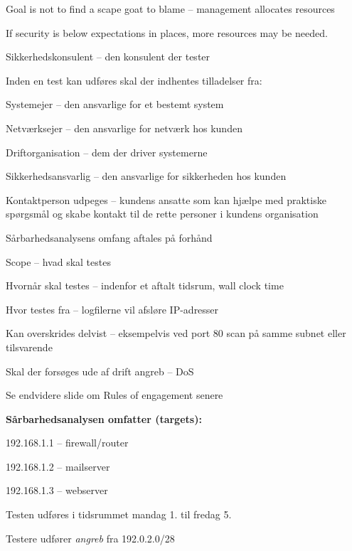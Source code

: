 \documentclass[Screen16to9,17pt]{foils}
\begin{document}
Goal is not to find a scape goat to blame -- management allocates resources

If security is below expectations in places, more resources may be needed.




\begin{list1}
\item Sikkerhedskonsulent -- den konsulent der tester
\item Inden en test kan udføres skal der indhentes tilladelser fra:
\begin{list2}
\item Systemejer -- den ansvarlige for et bestemt system
\item Netværksejer -- den ansvarlige for netværk hos kunden
\item Driftorganisation -- dem der driver systemerne
\item Sikkerhedsansvarlig -- den ansvarlige for sikkerheden hos kunden
\item Kontaktperson udpeges -- kundens ansatte som kan hjælpe med praktiske
  spørgsmål og skabe kontakt til de rette personer i kundens organisation
\end{list2}
\end{list1}


\begin{list1}
\item Sårbarhedsanalysens omfang aftales på forhånd
\begin{list2}
\item Scope -- hvad skal testes
\item Hvornår skal testes -- indenfor et aftalt tidsrum, wall clock time
\item Hvor testes fra -- logfilerne vil afsløre IP-adresser
\item Kan overskrides delvist -- eksempelvis ved port 80 scan på samme
  subnet eller tilsvarende
\item Skal der forsøges ude af drift angreb -- DoS
\item Se endvidere slide om Rules of engagement senere
\end{list2}
\item {\bf Sårbarhedsanalysen omfatter (targets):}
\begin{list2}
\item 192.168.1.1 -- firewall/router
\item 192.168.1.2 -- mailserver
\item 192.168.1.3 -- webserver
\item Testen udføres i tidsrummet mandag 1. til fredag 5.
\item Testere udfører \emph{angreb} fra 192.0.2.0/28
\end{list2}
\end{list1}
\end{document}
